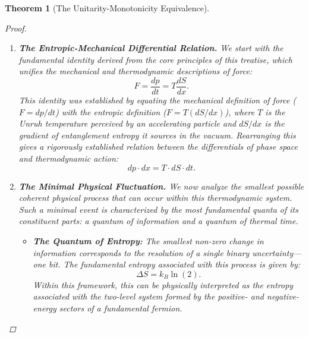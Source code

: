 \documentclass[11pt, letterpaper]{report}
\theoremstyle{plain} %
\newtheorem{theorem}{Theorem}[chapter]
\theoremstyle{definition} %
\theoremstyle{remark} %
\begin{document}
\begin{theorem}[The Unitarity-Monotonicity Equivalence]
\begin{proof}
\begin{enumerate}
    \item \textbf{The Entropic-Mechanical Differential Relation.} We start with the fundamental identity derived from the core principles of this treatise, which unifies the mechanical and thermodynamic descriptions of force:
    $$ F = \frac{dp}{dt} = T \frac{dS}{dx}. $$
    This identity was established by equating the mechanical definition of force ($F=dp/dt$) with the entropic definition ($F=T(dS/dx)$), where $T$ is the Unruh temperature perceived by an accelerating particle and $dS/dx$ is the gradient of entanglement entropy it sources in the vacuum. Rearranging this gives a rigorously established relation between the differentials of phase space and thermodynamic action:
    \begin{equation}
        dp \cdot dx = T \cdot dS \cdot dt.
        \label{eq:verify_differential_relation}
    \end{equation}

    \item \textbf{The Minimal Physical Fluctuation.} We now analyze the smallest possible coherent physical process that can occur within this thermodynamic system. Such a minimal event is characterized by the most fundamental quanta of its constituent parts: a quantum of information and a quantum of thermal time.
        \begin{itemize}
            \item \textbf{The Quantum of Entropy:} The smallest non-zero change in information corresponds to the resolution of a single binary uncertainty—one bit. The fundamental entropy associated with this process is given by:
            \begin{equation}
                \Delta S = k_B \ln(2).
            \end{equation}
            Within this framework, this can be physically interpreted as the entropy associated with the two-level system formed by the positive- and negative-energy sectors of a fundamental fermion.


\end{itemize}
\end{enumerate}
\end{proof}
\end{theorem}
\end{document}
